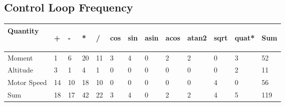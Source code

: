 \documentclass{article}
\numberwithin{equation}{section} %
\begin{document}
\subsection{Control Loop Frequency}
\begin{longtable}{l l l l l l l l l l l l l}
Quantity&	
\begin{sideways}+\end{sideways}	&	
\begin{sideways}-\end{sideways}	&	
\begin{sideways}*\end{sideways}	&	
\begin{sideways}/\end{sideways}	&	
\begin{sideways}cos\end{sideways}	&	
\begin{sideways}sin\end{sideways}	&	
\begin{sideways}asin\end{sideways}	&	
\begin{sideways}acos\end{sideways}	&	
\begin{sideways}atan2\end{sideways}	&	
\begin{sideways}sqrt\end{sideways}	&	
\begin{sideways}quat*\end{sideways}	&	
\begin{sideways}Sum\end{sideways}\\
	\hline
Moment	&	1	&	6	&	20	&	11	&	3	&	4	&	0	&	2	&	2	&	0	&	3	&	52 \\
	\hline
Altitude &	3	&	1	&	4	&	1	&	0	&	0	&	0	&	0	&	0	&	0	&	2	&	11	 \\
	\hline
Motor Speed	&	14	&	10	&	18	&	10	&	0	&	0	&	0	&	0	&	0	&	4	&	0	&	56		 \\
	\hline
	Sum	&	18	&	17	&	42	&	22	&	3	&	4	&	0	&	2	&	2	&	4	&	5	&	119	\\
\end{longtable}
\end{document}
